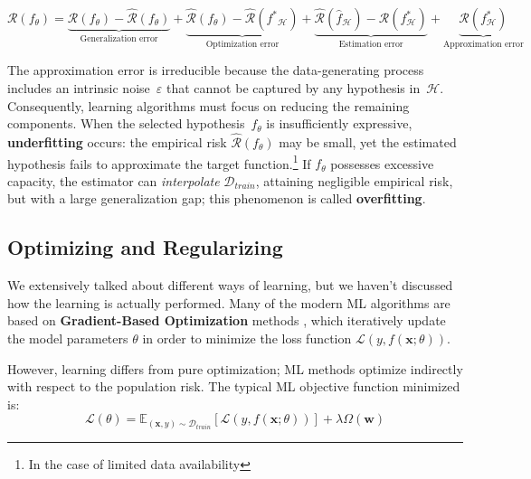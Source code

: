 \begin{equation}
\label{eq:risk_decomposition}
    \mathcal{R}(f_\theta) = 
    \underbrace{\mathcal{R}(f_\theta) - \hat{\mathcal{R}}(f_\theta)}_{\text{Generalization error}}
     + \underbrace{\hat{\mathcal{R}}(f_\theta) - \hat{\mathcal{R}}({f^*}_\mathcal{H})}_{\text{Optimization error}} 
     + \underbrace{\hat{\mathcal{R}}(\hat{f}_\mathcal{H}) - \mathcal{R}(f_\mathcal{H}^*)}_{\text{Estimation error}} + \underbrace{\mathcal{R}(f_\mathcal{H}^*)}_{\text{Approximation error}} 
\end{equation}

The approximation error is irreducible because the data-generating process includes 
an intrinsic noise~$\varepsilon$ that cannot be captured by any hypothesis
 in~$\mathcal{H}$. Consequently, learning algorithms must focus on reducing the remaining
  components. When the selected hypothesis~$f_\theta$ is insufficiently 
  expressive, \textbf{underfitting} occurs: the empirical risk $\hat{\mathcal{R}}(f_\theta)$ may be small,
   yet the estimated hypothesis fails to approximate the target function.\footnote{In the case of limited data availability}
   If $f_\theta$ possesses excessive capacity, the estimator
     can \textit{interpolate} $\mathcal{D}_{train}$, attaining negligible empirical risk, but with a large generalization gap; 
     this phenomenon is called \textbf{overfitting}. 

\subsection{Optimizing and Regularizing}
We extensively talked about different ways of learning, but we haven't discussed how the learning is actually performed.
Many of the modern ML algorithms are based on \textbf{Gradient-Based Optimization} methods \cite{GVK502988711}, which iteratively update the model parameters $\theta$ in order to minimize the loss function $\mathcal{L}(y, f(\mathbf{x}; \theta))$.


However, learning differs from pure optimization; ML methods optimize indirectly with respect to the population risk.
The typical ML objective function minimized is:
\begin{equation}
    \mathcal{L}(\theta) = \mathbb{E}_{(\mathbf{x}, y) \sim \mathcal{D}_{train}}[\mathcal{L}(y, f(\mathbf{x}; \theta))] + \lambda \Omega(\mathbf{w}) 
\end{equation}


